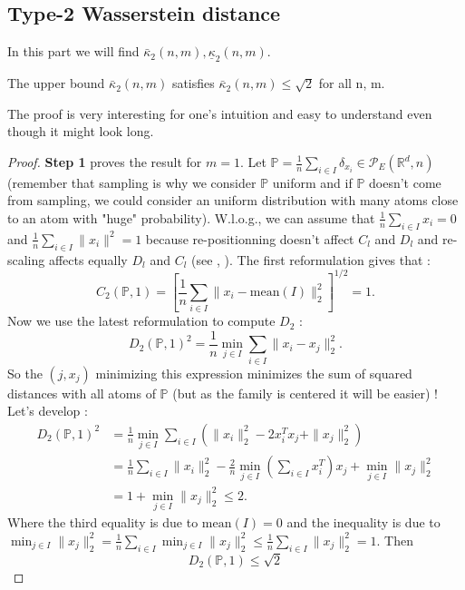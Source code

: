 \documentclass{amsart}
\newcommand{\RR}{\mathbb{R}}
\begin{document}
\subsection{Type-2 Wasserstein distance}
In this part we will find $\bar{\kappa}_2\left(n,m\right), \underline\kappa_2\left(n,m\right)$.
\begin{theorem}
    The upper bound $\bar\kappa_2\left(n,m\right)$ satisfies $\bar\kappa_2\left(n,m\right)\leq \sqrt{2}$ for all n, m.
\end{theorem}
The proof is very interesting for one's intuition and easy to understand even though it might look long.
\begin{proof}
    \textbf{Step 1} proves the result for $m=1$. Let $\mathbb{P}=\frac{1}{n}\sum_{i\in I}\delta_{x_i}\in\mathcal{P}_E\left(\RR^d,n\right)$ (remember that sampling is why we consider $\mathbb{P}$ uniform and if $\mathbb{P}$ doesn't come from sampling, we could consider an uniform distribution with many atoms close to an atom with "huge" probability). W.l.o.g., we can assume that $\frac{1}{n}\sum_{i\in I}x_i=0$ and $\frac{1}{n}\sum_{i\in I}\lVert x_i\rVert^2=1$ because re-positionning doesn't affect $C_l$ and $D_l$ and re-scaling affects equally $D_l$ and $C_l$ (see , ).
    \newline
    The first reformulation gives that :
    $$
    C_2\left(\mathbb{P},1\right)=\left[\frac{1}{n}\sum_{i\in I}\lVert x_i-\text{mean}(I)\rVert_2^2\right]^{1/2}=1.
    $$
    Now we use the latest reformulation to compute $D_2$ :
    $$
    D_2\left(\mathbb{P},1\right)^2=\frac{1}{n}\min_{j\in I}\sum_{i\in I}\lVert x_i-x_j\rVert^2_2.
    $$
    So the $\left(j, x_j\right)$ minimizing this expression minimizes the sum of squared distances with all atoms of $\mathbb{P}$ (but as the family is centered it will be easier) ! Let's develop :
    \begin{align*}
    D_2\left(\mathbb{P},1\right)^2&=\frac{1}{n}\min_{j\in I}\sum_{i\in I}\left(\rVert x_i\rVert^2_2-2x_i^Tx_j+\rVert x_j\rVert^2_2\right)\\&=\frac{1}{n}\sum_{i\in I}\lVert x_i\rVert_2^2-\frac{2}{n}\min_{j\in I}\left(\sum_{i\in I}x_i^T\right)x_j+\min_{j\in I}\lVert x_j\rVert^2_2 \\&=1+\min_{j\in I}\lVert x_j\rVert^2_2\leq2.
    \end{align*}
Where the third equality is due to $\text{mean}(I)=0$ and the inequality is due to $\min_{j\in I}\lVert x_j\rVert^2_2=\frac{1}{n}\sum_{i\in I}\min_{j\in I}\lVert x_j\rVert^2_2\leq \frac{1}{n}\sum_{i\in I}\lVert x_j\rVert^2_2=1$. Then $$D_2\left(\mathbb{P},1\right)\leq\sqrt{2}$$

\end{proof}
\end{document}
